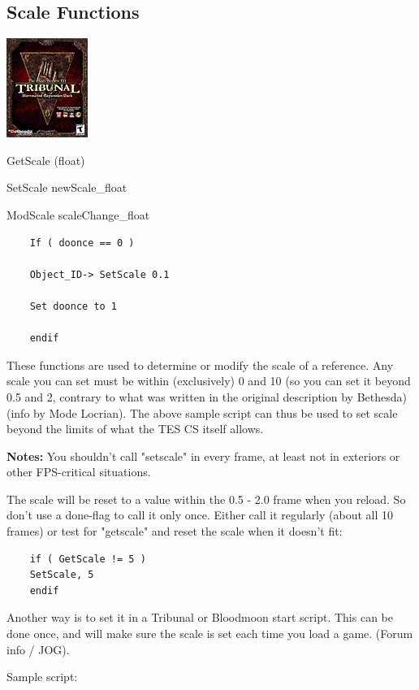 \hypertarget{scale-functions}{%
\subsection{\texorpdfstring{\hfill\break
Scale Functions}{ Scale Functions}}\label{scale-functions}}

\includegraphics{media/image6.png}

	GetScale (float)
	
	SetScale newScale\_float
	
	ModScale scaleChange\_float

\begin{lstlisting}	
	If ( doonce == 0 )
	
	Object_ID-> SetScale 0.1
	
	Set doonce to 1
	
	endif
\end{lstlisting}

These functions are used to determine or modify the scale of a
reference. Any scale you can set must be within (exclusively) 0 and 10
(so you can set it beyond 0.5 and 2, contrary to what was written in the
original description by Bethesda) (info by Mode Locrian). The above
sample script can thus be used to set scale beyond the limits of what
the TES CS itself allows.

\textbf{Notes:} You shouldn't call "setscale" in every frame, at least
not in exteriors or other FPS-critical situations.

The scale will be reset to a value within the 0.5 - 2.0 frame when you
reload. So don't use a done-flag to call it only once. Either call it
regularly (about all 10 frames) or test for "getscale" and reset the
scale when it doesn't fit:

\begin{lstlisting}
	if ( GetScale != 5 )
	SetScale, 5
	endif
\end{lstlisting}

Another way is to set it in a Tribunal or Bloodmoon start script. This
can be done once, and will make sure the scale is set each time you load
a game. (Forum info / JOG).

Sample script:

